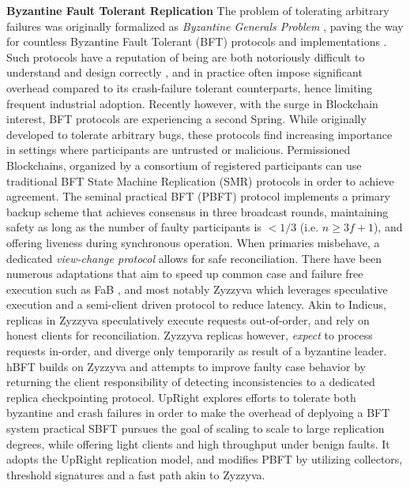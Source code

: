 \textbf{Byzantine Fault Tolerant Replication} 
 The problem of tolerating arbitrary failures was originally formalized as \textit{Byzantine Generals Problem} \cite{lamport2019byzantine}, paving the way for countless Byzantine Fault Tolerant (BFT) protocols and implementations \cite{castro1999practical, martin2006fast, kotla2007zyzzyva, pires2018generalized, bessani2014state, lamport2011byzantizing, arun2019ezbft, malkhi2019flexible, duan2014hbft, yin2003separating}. Such protocols have a reputation of being are both notoriously difficult to understand and design correctly \cite{abraham2017revisiting, abraham2018revisiting, shrestha2019revisiting}, and in practice often impose significant overhead compared to its crash-failure tolerant counterparts, hence limiting frequent industrial adoption.
Recently however, with the surge in Blockchain interest, BFT protocols are experiencing a second Spring. While originally developed to tolerate arbitrary bugs, these protocols find increasing importance in settings where participants are untrusted or malicious. Permissioned Blockchains, organized by a consortium of registered participants can use traditional BFT State Machine Replication (SMR) protocols in order to achieve agreement. 
The seminal practical BFT (PBFT) protocol \cite{castro1999practical} implements a primary backup scheme that achieves consensus in three broadcast rounds, maintaining safety as long as the number of faulty participants is $<1/3$ (i.e. $n\geq 3f+1$), and offering liveness during synchronous operation. When primaries misbehave, a dedicated \textit{view-change protocol} allows for safe reconciliation. There have been numerous adaptations that aim to speed up common case and failure free execution such as FaB \cite{martin2006fast}, and most notably Zyzzyva \cite{kotla2007zyzzyva} which leverages speculative execution and a semi-client driven protocol to reduce latency. Akin to Indicus, replicas in Zyzzyva speculatively execute requests out-of-order, and rely on honest clients for reconciliation. Zyzzyva replicas however, \textit{expect} to process requests in-order, and diverge only temporarily as result of a byzantine leader. hBFT builds on Zyzzyva and attempts to improve faulty case behavior by returning the client responsibility of detecting inconsistencies to a dedicated replica checkpointing protocol. 
UpRight explores efforts to tolerate both byzantine and crash failures in order to make the overhead of deplyoing a BFT system practical
SBFT \cite{gueta2018sbft} pursues the goal of scaling to scale to large replication degrees, while offering light clients and high throughput under benign faults. It adopts the UpRight replication model, and modifies PBFT by utilizing collectors, threshold signatures and a fast path akin to Zyzzyva. 
